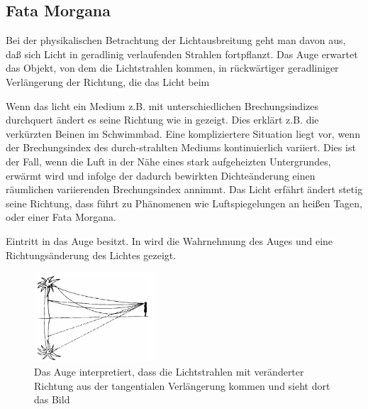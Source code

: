 

\subsection{Fata Morgana}
\cite{fataEinleitung}
Bei der physikalischen Betrachtung der Lichtausbreitung geht man davon aus, daß sich Licht in
geradlinig verlaufenden Strahlen fortpflanzt. Das Auge erwartet das Objekt, von dem die Lichtstrahlen
kommen, in rückwärtiger geradliniger Verlängerung der Richtung, die das Licht beim

Wenn das licht ein Medium z.B. mit unterschiedlichen Brechungsindizes durchquert ändert es seine Richtung wie in  gezeigt. Dies erklärt z.B. die verkürzten Beinen im Schwimmbad.
Eine kompliziertere Situation liegt vor, wenn der Brechungsindex des durch-strahlten Mediums kontinuierlich variiert. 
Dies ist der Fall, wenn die Luft in der Nähe eines stark aufgeheizten Untergrundes, erwärmt
wird und infolge der dadurch bewirkten Dichteänderung einen räumlichen variierenden Brechungsindex annimmt. 
Das Licht erfährt ändert stetig seine Richtung, dass führt zu Phänomenen wie Luftspiegelungen an heißen Tagen, oder einer Fata Morgana. 

Eintritt in das Auge besitzt. In  wird die Wahrnehmung des Auges und eine Richtungsänderung des Lichtes gezeigt.

\begin{figure}[H]
	\includegraphics[width=0.4\textwidth]{./picture/FataEinleitung.png}
	\caption{Das Auge interpretiert, dass die Lichtstrahlen mit veränderter Richtung aus der tangentialen Verlängerung kommen und sieht dort das Bild}
	\label{Ab:fataEinleitung}
\end{figure}


